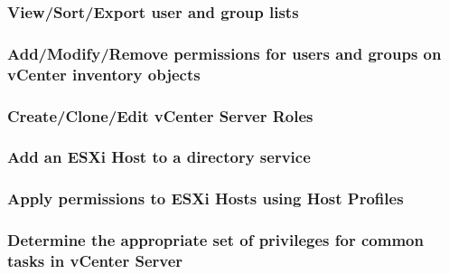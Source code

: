 \subsubsection{View/Sort/Export user and group lists}

\subsubsection{Add/Modify/Remove permissions for users and groups on vCenter inventory objects}

\subsubsection{Create/Clone/Edit vCenter Server Roles}

\subsubsection{Add an ESXi Host to a directory service}

\subsubsection{Apply permissions to ESXi Hosts using Host Profiles}

\subsubsection{Determine the appropriate set of privileges for common tasks in vCenter Server}

